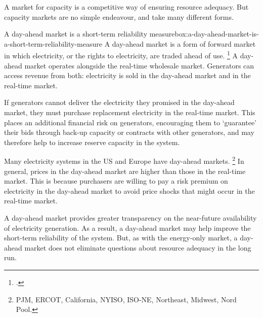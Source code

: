 \documentclass[FrontPage]{grattan}
\begin{document}
A market for capacity is a competitive way of ensuring resource adequacy. But capacity markets are no simple endeavour, and take many different forms.

\begin{smallbox}{A day-ahead market is a short-term reliability measure}{box:a-day-ahead-market-is-a-short-term-reliability-measure}
A day-ahead market is a form of forward market in which electricity, or the rights to electricity, are traded ahead of use.%
\footcite{Schubert2002WholesaleMarketDesigns}
A day-ahead market operates alongside the real-time wholesale market. Generators can access revenue from both: electricity is sold in the day-ahead market and in the real-time market.

If generators cannot deliver the electricity they promised in the day-ahead market, they must purchase replacement electricity in the real-time market. This places an additional financial risk on generators, encouraging them to `guarantee' their bids through back-up capacity or contracts with other generators, and may therefore help to increase reserve capacity in the system.

Many electricity systems in the US and Europe have day-ahead markets.%
\footnote{\eg{} PJM, ERCOT, California, NYISO, ISO-NE, Northeast, Midwest, Nord Pool.}
In general, prices in the day-ahead market are higher than those in the real-time market. This is because purchasers are willing to pay a risk premium on electricity in the day-ahead market to avoid price shocks that might occur in the real-time market. 

A day-ahead market provides greater transparency on the near-future availability of electricity generation. As a result, a day-ahead market may help improve the short-term reliability of the system. But, as with the energy-only market, a day-ahead market does not eliminate questions about resource adequacy in the long run.  
\end{smallbox}
\end{document}
